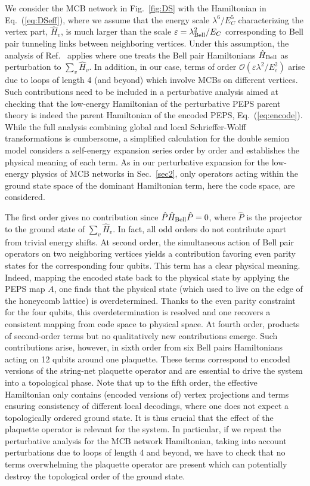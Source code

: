 \documentclass[twocolumn,floats,prx,showpacs]{revtex4-1}
\begin{document}
We consider the MCB network in Fig.~\ref{fig:DS} with the Hamiltonian in Eq.~(\ref{eq:DSeff}), where we assume that the energy scale $\lambda^6/E_C^5$ characterizing the vertex part, $\hat H_v$, is much larger than the scale $\varepsilon=\lambda_{\rm Bell}^2/E_C$ corresponding to Bell pair tunneling links between neighboring vertices. Under this assumption, the analysis of Ref.~\cite{Brell2014PEPS} applies where one treats the Bell pair Hamiltonians $\hat H_{\rm Bell}$ as perturbation to $\sum_v \hat H_v$.
In addition, in our case, terms of order $\mathcal O(\varepsilon\lambda^2/E_c^2)$ arise due to loops of length 4 (and beyond) which 
involve MCBs on different vertices. Such contributions need to be
included in a perturbative analysis aimed at checking that the low-energy Hamiltonian of the perturbative PEPS parent theory is indeed the parent Hamiltonian of the encoded PEPS, Eq.~(\ref{eq:encode}). While the full analysis combining global and local Schrieffer-Wolff transformations \cite{Bravyi2011} is cumbersome, a simplified calculation \cite{Brell2014} for the double semion model considers a self-energy expansion series order by order and establishes the physical meaning of each term. As in our perturbative expansion for the low-energy physics of MCB networks in Sec.~\ref{sec2}, 
only operators acting within the ground state space of the dominant Hamiltonian term, here the code space, are considered. 

The first order gives no contribution since  $\hat P \hat H_{\rm Bell}\hat P=0$, where $\hat P$ is the projector to the ground state of $\sum_v \hat H_v$. In fact,
all odd orders do not contribute apart from trivial energy shifts.
At second order, the simultaneous action of Bell pair operators on two neighboring vertices yields a contribution favoring even parity states for the corresponding four qubits. This term has a clear physical meaning. 
Indeed, mapping the encoded state back to the physical state by applying the PEPS map $A$, one finds that the physical state (which used to live on the edge of the honeycomb lattice) is overdetermined. Thanks to the even parity constraint for the four qubits, this overdetermination is resolved and one recovers a consistent mapping from code space to physical space.  At fourth order, products of second-order terms but no  qualitatively new contributions emerge. Such contributions arise, however, 
in sixth order from six Bell pairs Hamiltonians acting on 12 qubits around one plaquette. These terms correspond to encoded versions of the string-net plaquette operator and are essential to drive the system into a topological phase. Note that up to the fifth order, the effective Hamiltonian only contains (encoded versions of) vertex projections and terms ensuring consistency of different local decodings, where one does not expect a topologically ordered ground state.
It is thus crucial that the effect of the plaquette operator is relevant for the system. In particular, if we repeat the perturbative analysis for the MCB network Hamiltonian, taking into account perturbations due to loops of length 4 and beyond, we have to check that no terms overwhelming the plaquette operator are present which can potentially destroy the topological order of the ground state.   
\end{document}
